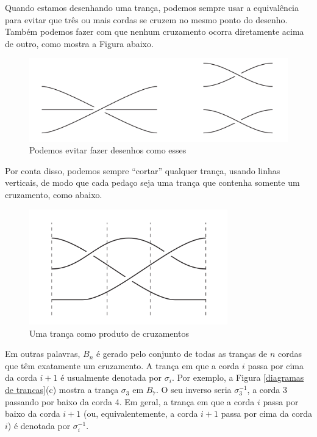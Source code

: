 	\par\vspace{0.3cm} Quando estamos desenhando uma trança, podemos sempre usar a equivalência para 
	evitar que três ou mais cordas se cruzem no mesmo ponto do desenho. Também podemos fazer com que 
	nenhum cruzamento ocorra diretamente acima de outro, como mostra a Figura abaixo.
	\begin{figure}[H]
		\captionsetup{justification=centering}
		\begin{center}
			\includegraphics[width=12cm]{Images/desenhos_evitaveis.png}
		\end{center}\caption{Podemos evitar fazer desenhos como esses}\label{diagramas indesejaveis}
	\end{figure}
	\par\vspace{0.3cm} Por conta disso, podemos sempre ``cortar'' qualquer trança, usando linhas verticais, 
	de modo que cada pedaço seja uma trança que contenha somente um cruzamento, como abaixo.
	\begin{figure}[H]
		\captionsetup{justification=centering}
		\begin{center}
			\includegraphics[width=8.6cm]{Images/fig_18_8.png}
		\end{center}\caption{Uma trança como produto de cruzamentos}\label{cortar trancas}
	\end{figure} 
	\par\vspace{0.3cm} Em outras palavras, $B_n$ é gerado pelo conjunto de todas as tranças de $n$ 
	cordas que têm exatamente um cruzamento. A trança em que a corda $i$ passa por cima da corda $i+1$ é 
	usualmente denotada por $\sigma_i$. Por exemplo, a Figura \eqref{diagramas de trancas}(c) mostra a trança
	$\sigma_3$ em $B_7$. O seu inverso seria $\sigma_3^{-1}$, a corda 3 passando por baixo da corda 4. 
	Em geral, a trança em que a corda $i$ passa por baixo da corda $i+1$ (ou, equivalentemente, a corda 
	$i+1$ passa por cima da corda $i$) é denotada por $\sigma_i^{-1}$. 
	
